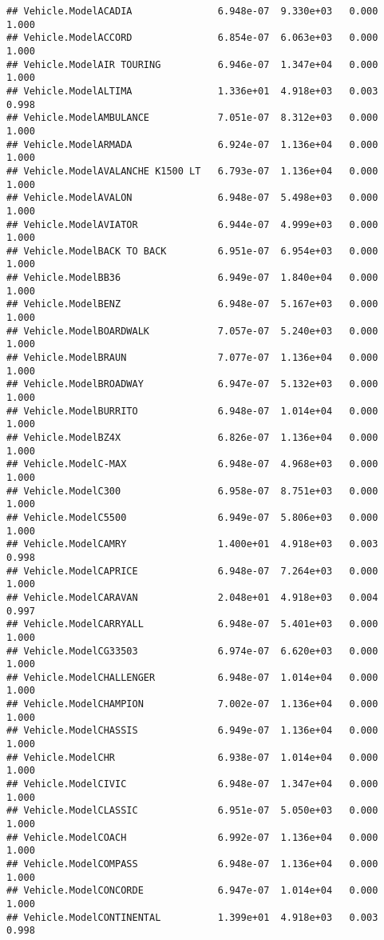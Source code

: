 \documentclass[
]{article}
\begin{document}
\begin{verbatim}
## Vehicle.ModelACADIA               6.948e-07  9.330e+03   0.000    1.000
## Vehicle.ModelACCORD               6.854e-07  6.063e+03   0.000    1.000
## Vehicle.ModelAIR TOURING          6.946e-07  1.347e+04   0.000    1.000
## Vehicle.ModelALTIMA               1.336e+01  4.918e+03   0.003    0.998
## Vehicle.ModelAMBULANCE            7.051e-07  8.312e+03   0.000    1.000
## Vehicle.ModelARMADA               6.924e-07  1.136e+04   0.000    1.000
## Vehicle.ModelAVALANCHE K1500 LT   6.793e-07  1.136e+04   0.000    1.000
## Vehicle.ModelAVALON               6.948e-07  5.498e+03   0.000    1.000
## Vehicle.ModelAVIATOR              6.944e-07  4.999e+03   0.000    1.000
## Vehicle.ModelBACK TO BACK         6.951e-07  6.954e+03   0.000    1.000
## Vehicle.ModelBB36                 6.949e-07  1.840e+04   0.000    1.000
## Vehicle.ModelBENZ                 6.948e-07  5.167e+03   0.000    1.000
## Vehicle.ModelBOARDWALK            7.057e-07  5.240e+03   0.000    1.000
## Vehicle.ModelBRAUN                7.077e-07  1.136e+04   0.000    1.000
## Vehicle.ModelBROADWAY             6.947e-07  5.132e+03   0.000    1.000
## Vehicle.ModelBURRITO              6.948e-07  1.014e+04   0.000    1.000
## Vehicle.ModelBZ4X                 6.826e-07  1.136e+04   0.000    1.000
## Vehicle.ModelC-MAX                6.948e-07  4.968e+03   0.000    1.000
## Vehicle.ModelC300                 6.958e-07  8.751e+03   0.000    1.000
## Vehicle.ModelC5500                6.949e-07  5.806e+03   0.000    1.000
## Vehicle.ModelCAMRY                1.400e+01  4.918e+03   0.003    0.998
## Vehicle.ModelCAPRICE              6.948e-07  7.264e+03   0.000    1.000
## Vehicle.ModelCARAVAN              2.048e+01  4.918e+03   0.004    0.997
## Vehicle.ModelCARRYALL             6.948e-07  5.401e+03   0.000    1.000
## Vehicle.ModelCG33503              6.974e-07  6.620e+03   0.000    1.000
## Vehicle.ModelCHALLENGER           6.948e-07  1.014e+04   0.000    1.000
## Vehicle.ModelCHAMPION             7.002e-07  1.136e+04   0.000    1.000
## Vehicle.ModelCHASSIS              6.949e-07  1.136e+04   0.000    1.000
## Vehicle.ModelCHR                  6.938e-07  1.014e+04   0.000    1.000
## Vehicle.ModelCIVIC                6.948e-07  1.347e+04   0.000    1.000
## Vehicle.ModelCLASSIC              6.951e-07  5.050e+03   0.000    1.000
## Vehicle.ModelCOACH                6.992e-07  1.136e+04   0.000    1.000
## Vehicle.ModelCOMPASS              6.948e-07  1.136e+04   0.000    1.000
## Vehicle.ModelCONCORDE             6.947e-07  1.014e+04   0.000    1.000
## Vehicle.ModelCONTINENTAL          1.399e+01  4.918e+03   0.003    0.998

\end{verbatim}
\end{document}
